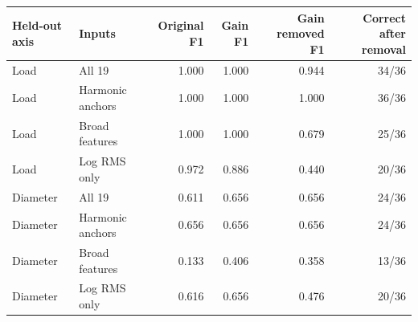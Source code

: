 \begin{tabular}{@{}llrrrr@{}}
\toprule
Held-out axis & Inputs & Original F1 & Gain F1 & Gain removed F1 & Correct after removal \\
\midrule
Load & All 19 & 1.000 & 1.000 & 0.944 & 34/36 \\
Load & Harmonic anchors & 1.000 & 1.000 & 1.000 & 36/36 \\
Load & Broad features & 1.000 & 1.000 & 0.679 & 25/36 \\
Load & Log RMS only & 0.972 & 0.886 & 0.440 & 20/36 \\
Diameter & All 19 & 0.611 & 0.656 & 0.656 & 24/36 \\
Diameter & Harmonic anchors & 0.656 & 0.656 & 0.656 & 24/36 \\
Diameter & Broad features & 0.133 & 0.406 & 0.358 & 13/36 \\
Diameter & Log RMS only & 0.616 & 0.656 & 0.476 & 20/36 \\
\bottomrule
\end{tabular}
